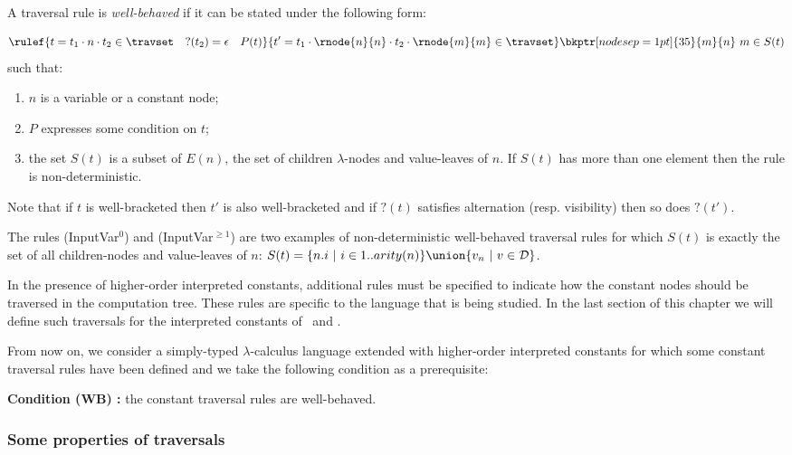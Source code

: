 \begin{dfn}
\label{def:wellbehaved_traversal}
A traversal rule is \emph{well-behaved} if it can be stated under the following form:
$$\rulef{t = t_1\cdot n \cdot t_2 \in \travset \quad ?(t_2) = \epsilon \quad P(t)}
  { \stackrel{  \rule{0pt}{3pt} }{t' = t_1\cdot \rnode{n}{n} \cdot t_2 \cdot \rnode{m}{m} \in \travset} }
   \bkptr[nodesep=1pt]{35}{m}{n}
    \ m\in S(t)
   $$
such that:
\begin{enumerate}
  \item $n$ is a variable or a constant node;
  \item $P$ expresses some condition on $t$;
  \item the set $S(t)$ is a subset of $E(n)$, the set of children $\lambda$-nodes and value-leaves of $n$.
  If $S(t)$ has more than one element then the rule is non-deterministic.
\end{enumerate}
\end{dfn}
Note that if $t$ is well-bracketed then $t'$ is also well-bracketed
and if $?(t)$ satisfies alternation (resp. visibility) then so does $?(t')$.


The rules (InputVar$^0$) and (InputVar$^{\geq1}$) are two examples of
non-deterministic well-behaved traversal rules for which
$S(t)$ is exactly the set of all children-nodes and value-leaves of $n$:
$S(t) = \{ n.i \ |\ i \in 1..arity(n) \} \union  \{ v_n \ | \ v \in \mathcal{D} \} $.


In the presence of higher-order interpreted constants, additional rules must be specified to indicate how
the constant nodes should be traversed in the computation tree. These rules
are specific to the language that is being studied.
In the last section of this chapter we will define such traversals for the interpreted constants of
\pcf\ and \ialgol.

From now on, we consider a simply-typed $\lambda$-calculus language extended with
higher-order interpreted constants for which some constant traversal rules have been defined
and we take the following condition as a prerequisite:
\begin{center}
  \textbf{Condition (WB) :} the constant traversal rules are well-behaved.
\end{center}


\subsubsection{Some properties of traversals}

